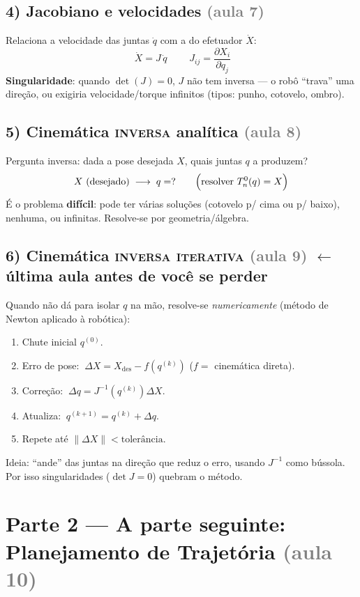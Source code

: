 \documentclass[11pt,a4paper]{article}
\newcommand{\aula}[1]{{\small\textcolor{gray}{(#1)}}}
\begin{document}
\subsection*{4) Jacobiano e velocidades \aula{aula 7}}
Relaciona a velocidade das juntas $\dot q$ com a do efetuador $\dot X$:
\[
\boxed{\;\dot X = J\,\dot q\;}\qquad
J_{ij} = \frac{\partial X_i}{\partial q_j}
\]
\textbf{Singularidade}: quando $\det(J)=0$, $J$ não tem inversa — o robô
``trava'' uma direção, ou exigiria velocidade/torque infinitos
(tipos: punho, cotovelo, ombro).

\subsection*{5) Cinemática \textsc{inversa} analítica \aula{aula 8}}
Pergunta inversa: dada a pose desejada $X$, quais juntas $q$ a produzem?
\[
X\ (\text{desejado}) \;\longrightarrow\; q = ?
\qquad\Bigl(\text{resolver } T^{0}_{n}(q)=X\Bigr)
\]
É o problema \textbf{difícil}: pode ter várias soluções (cotovelo p/ cima ou
p/ baixo), nenhuma, ou infinitas. Resolve-se por geometria/álgebra.

\subsection*{6) Cinemática \textsc{inversa iterativa} \aula{aula 9} \textmd{\textcolor{vinho}{$\leftarrow$ última aula antes de você se perder}}}
Quando não dá para isolar $q$ na mão, resolve-se \emph{numericamente}
(método de Newton aplicado à robótica):
\begin{enumerate}[leftmargin=2.2em]
  \item Chute inicial $q^{(0)}$.
  \item Erro de pose: $\ \Delta X = X_{\text{des}} - f\!\left(q^{(k)}\right)$
        \quad($f=$ cinemática direta).
  \item Correção: $\ \Delta q = J^{-1}\!\left(q^{(k)}\right)\Delta X$.
  \item Atualiza: $\ q^{(k+1)} = q^{(k)} + \Delta q$.
  \item Repete até $\lVert \Delta X\rVert < \text{tolerância}$.
\end{enumerate}
Ideia: ``ande'' das juntas na direção que reduz o erro, usando $J^{-1}$ como
bússola. Por isso singularidades ($\det J = 0$) quebram o método.

\section*{\textcolor{laranja}{Parte 2 — A parte seguinte: Planejamento de Trajetória \aula{aula 10}}}
\end{document}
